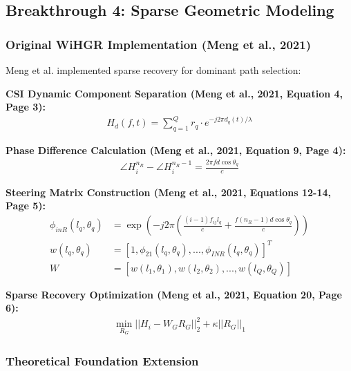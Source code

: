 \documentclass[12pt,a4paper]{article}
\begin{document}
\subsection{Breakthrough 4: Sparse Geometric Modeling}

\subsubsection{Original WiHGR Implementation (Meng et al., 2021)}

Meng et al. \cite{meng2021wihgr} implemented sparse recovery for dominant path selection:

\textbf{CSI Dynamic Component Separation (Meng et al., 2021, Equation 4, Page 3):}
\begin{align}
H_d(f,t) = \sum_{q=1}^Q r_q \cdot e^{-j2\pi d_q(t)/\lambda} \label{eq:wihgr_dynamic_csi}
\end{align}

\textbf{Phase Difference Calculation (Meng et al., 2021, Equation 9, Page 4):}
\begin{align}
\angle H_i^{n_R} - \angle H_i^{n_R-1} = \frac{2\pi f d \cos \theta_q}{c} \label{eq:wihgr_phase_difference}
\end{align}

\textbf{Steering Matrix Construction (Meng et al., 2021, Equations 12-14, Page 5):}
\begin{align}
\phi_{inR}(l_q, \theta_q) &= \exp\left(-j2\pi\left(\frac{(i-1)f_{ij}l_q}{c} + \frac{f(n_R-1)d\cos \theta_q}{c}\right)\right) \label{eq:wihgr_steering_element}\\
w(l_q, \theta_q) &= [1, \phi_{21}(l_q, \theta_q), ..., \phi_{INR}(l_q, \theta_q)]^T \label{eq:wihgr_steering_vector}\\
W &= [w(l_1, \theta_1), w(l_2, \theta_2), ..., w(l_Q, \theta_Q)] \label{eq:wihgr_steering_matrix}
\end{align}

\textbf{Sparse Recovery Optimization (Meng et al., 2021, Equation 20, Page 6):}
\begin{align}
\min_{R_G} ||H_i - W_G R_G||_2^2 + \kappa ||R_G||_1 \label{eq:wihgr_sparse_optimization}
\end{align}

\subsubsection{Theoretical Foundation Extension}
\end{document}
